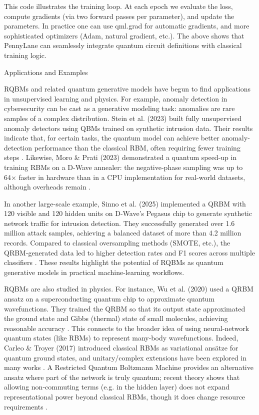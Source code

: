 This code illustrates the training loop.  At each epoch we evaluate the loss, compute gradients (via two forward passes per parameter), and update the parameters.  In practice one can use qml.grad for automatic gradients, and more sophisticated optimizers (Adam, natural gradient, etc.). The above shows that PennyLane can seamlessly integrate quantum circuit definitions with classical training logic.





Applications and Examples





RQBMs and related quantum generative models have begun to find applications in unsupervised learning and physics.  For example, anomaly detection in cybersecurity can be cast as a generative modeling task: anomalies are rare samples of a complex distribution.  Stein et al. (2023) built fully unsupervised anomaly detectors using QBMs trained on synthetic intrusion data.  Their results indicate that, for certain tasks, the quantum model can achieve better anomaly-detection performance than the classical RBM, often requiring fewer training steps .  Likewise, Moro & Prati (2023) demonstrated a quantum speed-up in training RBMs on a D-Wave annealer: the negative-phase sampling was up to 64× faster in hardware than in a CPU implementation for real-world datasets, although overheads remain .



In another large-scale example, Sinno et al. (2025) implemented a QRBM with 120 visible and 120 hidden units on D-Wave’s Pegasus chip to generate synthetic network traffic for intrusion detection.  They successfully generated over 1.6 million attack samples, achieving a balanced dataset of more than 4.2 million records.  Compared to classical oversampling methods (SMOTE, etc.), the QRBM-generated data led to higher detection rates and F1 scores across multiple classifiers . These results highlight the potential of RQBMs as quantum generative models in practical machine-learning workflows.



RQBMs are also studied in physics.  For instance, Wu et al. (2020) used a QRBM ansatz on a superconducting quantum chip to approximate quantum wavefunctions. They trained the QRBM so that its output state approximated the ground state and Gibbs (thermal) state of small molecules, achieving reasonable accuracy .  This connects to the broader idea of using neural-network quantum states (like RBMs) to represent many-body wavefunctions. Indeed, Carleo & Troyer (2017) introduced classical RBMs as variational ansätze for quantum ground states, and unitary/complex extensions have been explored in many works . A Restricted Quantum Boltzmann Machine provides an alternative ansatz where part of the network is truly quantum; recent theory shows that allowing non-commuting terms (e.g. in the hidden layer) does not expand representational power beyond classical RBMs, though it does change resource requirements .




